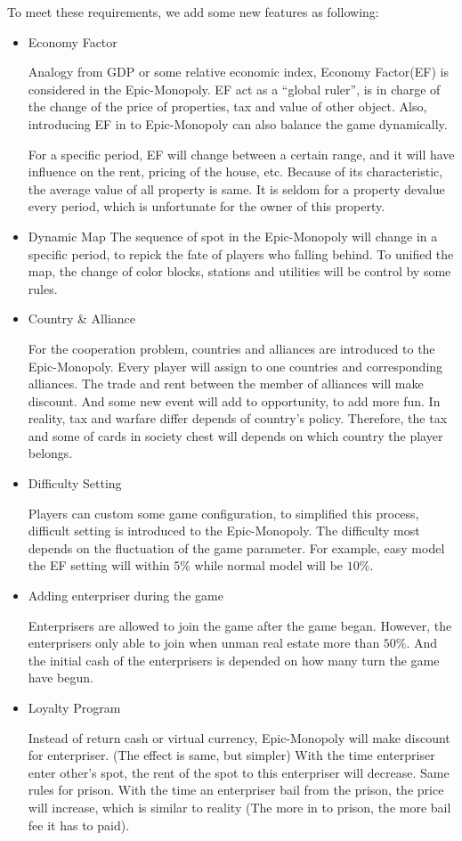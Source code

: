 \documentclass[a4paper,12pt]{article}
\begin{document}
To meet these requirements, we add some new features as following:
 
\begin{itemize}
	\item Economy Factor
	
	Analogy from GDP or some relative economic index, Economy Factor(EF) is considered in the Epic-Monopoly. EF act as a “global ruler”, is in charge of the change of the price of properties, tax and value of other object. Also, introducing EF in to Epic-Monopoly can also balance the game dynamically.
	
	For a specific period, EF will change between a certain range, and it will have influence on the rent, pricing of the house, etc. Because of its characteristic, the average value of all property is same. It is seldom for a property devalue every period, which is unfortunate for the owner of this property.
	
	\item Dynamic Map
	The sequence of spot in the Epic-Monopoly will change in a specific period, to repick the fate of players who falling behind. To unified the map, the change of color blocks, stations and utilities will be control by some rules.
	
	\item Country \& Alliance
	
	For the cooperation problem, countries and alliances are introduced to the Epic-Monopoly. Every player will assign to one countries and corresponding alliances. The trade and rent between the member of alliances will make discount. And some new event will add to opportunity, to add more fun. In reality, tax and warfare differ depends of country’s policy. Therefore, the tax and some of cards in society chest will depends on which country the player belongs.
	
	\item Difficulty Setting
	
	Players can custom some game configuration, to simplified this process, difficult setting is introduced to the Epic-Monopoly. The difficulty most depends on the fluctuation of the game parameter. For example, easy model the EF setting will within $5\%$ while normal model will be $10\%$. 
	
	\item Adding enterpriser during the game
	
	Enterprisers are allowed to join the game after the game began. However, the enterprisers only able to join when unman real estate more than $50\%$. And the initial cash of the enterprisers is depended on how many turn the game have begun.
	
	\item Loyalty Program
	
	Instead of return cash or virtual currency, Epic-Monopoly will make discount for enterpriser. (The effect is same, but simpler) With the time enterpriser enter other’s spot, the rent of the spot to this enterpriser will decrease.  Same rules for prison. With the time an enterpriser bail from the prison, the price will increase, which is similar to reality (The more in to prison, the more bail fee it has to paid).
\end{itemize}	
\end{document}
